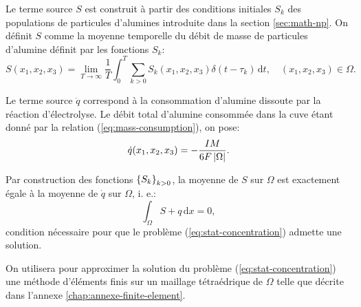 Le terme source $S$ est construit à partir des conditions initiales
$S_k$ des populations de particules d'alumines introduite dans la
section \ref{sec:math-np}. On définit $S$ comme la moyenne
temporelle du débit de masse de particules d'alumine définit par
les fonctions $S_k$:
\begin{equation}
  S(x_1,x_2,x_3) = \lim_{T\to\infty}\frac{1}{T}\int_0^T \sum_{k>0}
  S_k(x_1, x_2, x_3) \delta(t - \tau_k)\,\mathrm dt, \quad (x_1, x_2, x_3)\in\Omega.
\end{equation}

Le terme source $\dot q$ correspond à la consommation d'alumine
dissoute par la réaction d'électrolyse. Le débit total d'alumine
consommée dans la cuve étant donné par la relation
(\ref{eq:mass-consumption}), on pose:
\begin{equation}
  \dot q(x_1, x_2, x_3) = -\frac{IM}{6F\left\lvert \Omega \right\rvert}.
\end{equation}

\begin{remarque}
  Par construction des fonctions $\left\{ S_k \right\}_{k>0}$, la moyenne de $S$ sur
  $\Omega$ est exactement égale à la moyenne de $\dot q$ sur
  $\Omega$, i. e.:
  \begin{equation}
    \int_\Omega S + q\,\mathrm dx = 0,
  \end{equation}
  condition nécessaire pour que le problème
  (\ref{eq:stat-concentration}) admette une solution.
\end{remarque}

On utilisera pour approximer la solution du problème
(\ref{eq:stat-concentration}) une méthode d'éléments finis sur
un maillage tétraédrique de $\Omega$ telle que décrite dans
l'annexe \ref{chap:annexe-finite-element}.
